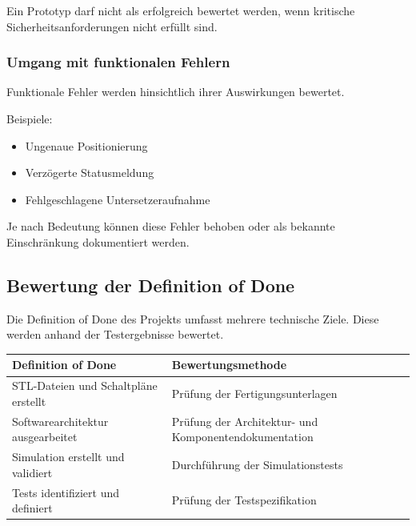 Ein Prototyp darf nicht als erfolgreich bewertet werden, wenn kritische
Sicherheitsanforderungen nicht erfüllt sind.

\subsubsection{Umgang mit funktionalen
Fehlern}\label{umgang-mit-funktionalen-fehlern}

Funktionale Fehler werden hinsichtlich ihrer Auswirkungen bewertet.

Beispiele:

\begin{itemize}
\tightlist
\item
  Ungenaue Positionierung
\item
  Verzögerte Statusmeldung
\item
  Fehlgeschlagene Untersetzeraufnahme
\end{itemize}

Je nach Bedeutung können diese Fehler behoben oder als bekannte
Einschränkung dokumentiert werden.

\subsection{Bewertung der Definition of
Done}\label{bewertung-der-definition-of-done}

Die Definition of Done des Projekts umfasst mehrere technische Ziele.
Diese werden anhand der Testergebnisse bewertet.

\begin{longtable}[]{@{}
  >{\raggedright\arraybackslash}p{}
  >{\raggedright\arraybackslash}p{}@{}}
\toprule\noalign{}
\begin{minipage}[b]{\linewidth}\raggedright
Definition of Done
\end{minipage} & \begin{minipage}[b]{\linewidth}\raggedright
Bewertungsmethode
\end{minipage} \\
\midrule\noalign{}
\endhead
\bottomrule\noalign{}
\endlastfoot
STL-Dateien und Schaltpläne erstellt & Prüfung der
Fertigungsunterlagen \\
Softwarearchitektur ausgearbeitet & Prüfung der Architektur- und
Komponentendokumentation \\
Simulation erstellt und validiert & Durchführung der Simulationstests \\
Tests identifiziert und definiert & Prüfung der Testspezifikation \\
\end{longtable}

